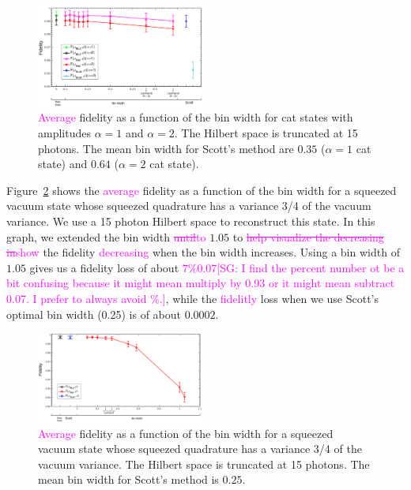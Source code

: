 \documentclass[
reprint,
superscriptaddress,
showpacs,
amsmath,
amssymb,
aps,
pra,
longbibliography
]{revtex4-1}
\providecommand{\aucmnt}[1]{#1}
\providecommand{\editcolor}[2]{\textcolor{#1}{#2}}
\providecommand{\aucmnt}[1]{}
\providecommand{\editcolor}[2]{#2}
\newcommand{\SG}[1]{\editcolor{magenta}{#1}}
\newcommand{\SGs}[1]{\aucmnt{\editcolor{magenta}{\sout{#1}}}}
\newcommand{\SGc}[1]{\aucmnt{\editcolor{magenta}{[SG: #1]}}}
\begin{document}
\begin{figure}
  \includegraphics[width=0.49\textwidth]{fidelity_vs_binwidth_15_photons_catstate.eps}
  \caption{\SG{Average} fidelity as a function of the bin width for
    cat states with amplitudes $\alpha=1$ and $\alpha=2$. The Hilbert
    space is truncated at 15 photons. The mean bin width for Scott's
    method are $0.35$ ($\alpha=1$ cat state) and $0.64$ ($\alpha=2$
    cat state).}
  \label{fig-fidelity_vs_binwidth_15_photons_catstate}
\end{figure}

Figure~\ref{fig-squeezedvacuum_15_photons_Var=075} shows the
\SG{average} fidelity as a function of the bin width for a squeezed
vacuum state whose squeezed quadrature has a variance 3/4 of the
vacuum variance.  We use a 15 photon Hilbert space to reconstruct this
state. In this graph, we extended the bin width \SGs{until}\SG{to}
$1.05$ to \SGs{help visualize the decreasing in}\SG{show} the fidelity
\SG{decreasing} when the bin width increases. Using a bin width of
$1.05$ gives us a fidelity loss of about \SGs{$7\%$}\SG{0.07}\SGc{I
  find the percent number ot be a bit confusing because it might mean
  multiply by 0.93 or it might mean subtract 0.07.  I prefer to always
  avoid $\%$.}, while the \SG{fidelitly} loss when we use Scott's
optimal bin width (0.25) is of about $0.0002$.


\begin{figure}
  \includegraphics[width=0.49\textwidth]{squeezedvacuum_15_photons_Var=075.eps}
  \caption{\SG{Average} fidelity as a function of the bin width for a
    squeezed vacuum state whose squeezed quadrature has a variance 3/4
    of the vacuum variance. The Hilbert space is truncated at 15
    photons. The mean bin width for Scott's method is $0.25$.}
  \label{fig-squeezedvacuum_15_photons_Var=075}
\end{figure}
\end{document}
